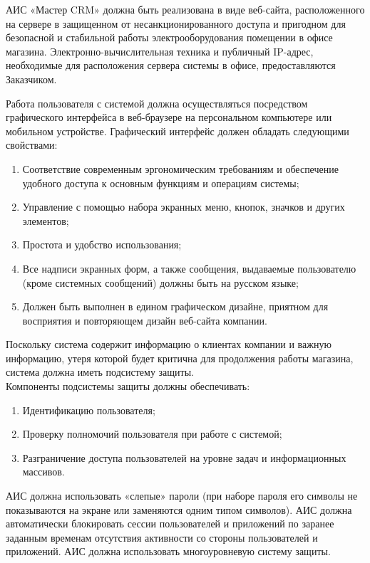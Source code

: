 \documentclass[a4paper,12pt]{article}
\begin{document}
АИС «Мастер CRM» должна быть реализована в виде веб-сайта, расположенного на сервере в защищенном от несанкционированного доступа и пригодном для безопасной и стабильной работы электрооборудования помещении в офисе магазина. Электронно-вычислительная техника и публичный IP-адрес, необходимые для расположения сервера системы в офисе, предоставляются Заказчиком. 

Работа пользователя с системой должна осуществляться посредством графического интерфейса в веб-браузере на персональном компьютере или мобильном устройстве. Графический интерфейс должен обладать следующими свойствами:
\begin{enumerate}
    \item Соответствие современным эргономическим требованиям и обеспечение удобного доступа к основным функциям и операциям системы;
    \item Управление с помощью набора экранных меню, кнопок, значков и других элементов;
    \item Простота и удобство использования;
    \item Все надписи экранных форм, а также сообщения, выдаваемые пользователю (кроме системных сообщений) должны быть на русском языке;
    \item Должен быть выполнен в едином графическом дизайне, приятном для восприятия и повторяющем дизайн веб-сайта компании.
\end{enumerate}

Поскольку система содержит информацию о клиентах компании и важную информацию, утеря которой будет критична для продолжения работы магазина, система должна иметь подсистему защиты.\\

Компоненты подсистемы защиты должны обеспечивать:
\begin{enumerate}
    \item Идентификацию пользователя;
    \item Проверку полномочий пользователя при работе с системой;
    \item Разграничение доступа пользователей на уровне задач и информационных массивов.
\end{enumerate}

АИС должна использовать «слепые» пароли (при наборе пароля его символы не показываются на экране или заменяются одним типом символов). АИС должна автоматически блокировать сессии пользователей и приложений по заранее заданным временам отсутствия активности со стороны пользователей и приложений. АИС должна использовать многоуровневую систему защиты.\\
\end{document}
